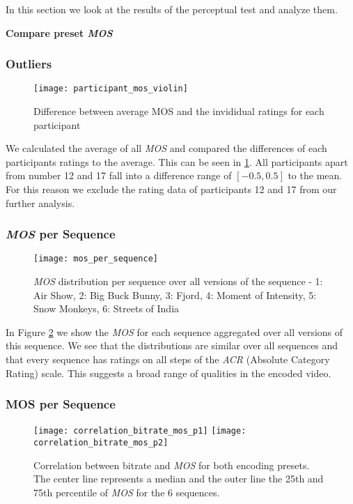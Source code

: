 In this section we look at the results of the perceptual test and analyze them.

\textbf{Compare preset \textit{MOS}}

\subsubsection{Outliers}
\begin{figure}[htb!]
	\centering
	\texttt{[image: participant\_mos\_violin]}
	\caption{Difference between average MOS and the invididual ratings for each participant}
	\label{fig:result:participant_violin}
\end{figure}

We calculated the average of all \textit{MOS} and compared the differences of each participants ratings to the average. This can be seen in \ref{fig:result:participant_violin}. All participants apart from number 12 and 17 fall into a difference range of $[-0.5, 0.5]$ to the mean. For this reason we exclude the rating data of participants 12 and 17 from our further analysis.





\subsubsection{\textit{MOS} per Sequence}
\begin{figure}[htb!]
	\centering
	\texttt{[image: mos\_per\_sequence]}
	\caption{\textit{MOS} distribution per sequence over all versions of the sequence - 1: Air Show, 2: Big Buck Bunny, 3: Fjord, 4: Moment of Intensity, 5: Snow Monkeys, 6: Streets of India}
	\label{fig:result:mos_per_sequence}
\end{figure}

In Figure \ref{fig:result:mos_per_sequence} we show the \textit{MOS} for each sequence aggregated over all versions of this sequence. We see that the distributions are similar over all sequences and that every sequence has ratings on all steps of the \textit{ACR} (Absolute Category Rating) scale. This suggests a broad range of qualities in the encoded video.




\subsubsection{MOS per Sequence}
\begin{figure*}[htb!]
	\centering
	\texttt{[image: correlation\_bitrate\_mos\_p1]}
	\texttt{[image: correlation\_bitrate\_mos\_p2]}
	\caption{Correlation between bitrate and \textit{MOS} for both encoding presets. The center line represents a median and the outer line the 25th and 75th percentile of \textit{MOS} for the 6 sequences.}
	\label{fig:result:correlation_bitrate_mos}
\end{figure*}

